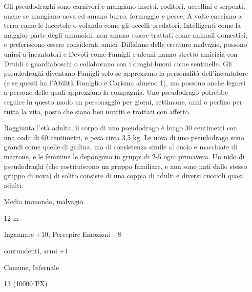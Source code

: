 \begin{multicols}{2}
{Gli pseudodraghi sono carnivori e mangiano insetti, roditori, uccellini e serpenti, anche se mangiano uova ed amano burro, formaggio e pesce. A volte cacciano a terra come le lucertole o volando come gli uccelli predatori. Intelligenti come la maggior parte degli umanoidi, non amano essere trattati come animali domestici, e preferiscono essere considerati amici. Diffidano delle creature malvagie, possono unirsi a incantatori e Devoti come Famigli e alcuni hanno stretto amicizia con Druidi e guardiaboschi o collaborano con i draghi buoni come sentinelle. Gli pseudodraghi diventano Famigli solo se apprezzano la personalità dell'incantatore (e se questi ha l'Abilità Famiglio e Carisma almeno 1), ma possono anche legarsi a persone delle quali apprezzano la compagnia. Uno pseudodrago potrebbe seguire in questo modo un personaggio per giorni, settimane, anni o perfino per tutta la vita, posto che siano ben nutriti e trattati con affetto.

Raggiunta l'età adulta, il corpo di uno pseudodrago è lungo 30 centimetri con una coda di 60 centimetri, e pesa circa 3,5 kg. Le uova di uno pseudodrago sono grandi come quelle di gallina, ma di consistenza simile al cuoio e macchiate di marrone, e le femmine le depongono in gruppi di 2-5 ogni primavera. Un nido di pseudodraghi (che costituiscono un gruppo familiare, e non sono nati dallo stesso gruppo di uova) di solito consiste di una coppia di adulti e diversi cuccioli quasi adulti.


\begin{description}[noitemsep, topsep=0pt, parsep=0pt, partopsep=0pt, itemsep=1pt, leftmargin=2.35cm,  labelwidth=2.2cm, itemindent=0cm, listparindent=0pt] %
\setlength{\baselineskip}{10pt}
\item[\textbf{Taglia/Tipo}] Media immondo, malvagio
\item[\textbf{Caratt.}] 
\item[\textbf{Punti Ferita}] 
\item[\textbf{Movimento}] 12 m
\item[\textbf{Tiri Salvez.}] 
\item[\textbf{Comp.}] Ingannare +10, Percepire Emozioni +8
\item[\textbf{Imm. Danni}] contundenti, armi +1
\item[\textbf{Sensi}] 
\item[\textbf{Linguaggi}] Comune, Infernale
\item[\textbf{Sfida}] 13 (10000 PX)
\end{description}
\smallskip

}
\end{multicols}
